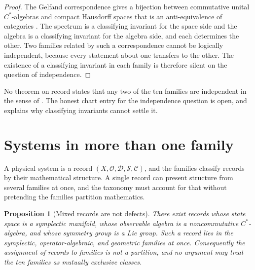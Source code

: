 \documentclass[11pt,letterpaper]{article}
\newtheorem{proposition}[theorem]{Proposition}
\theoremstyle{definition}
\theoremstyle{remark}
\begin{document}
\begin{proof}
The Gelfand correspondence gives a bijection between commutative unital $C^*$-algebras and compact Hausdorff spaces that is an anti-equivalence of categories \cite{gelfand-duality,gelfand-naimark}. The spectrum is a classifying invariant for the space side and the algebra is a classifying invariant for the algebra side, and each determines the other. Two families related by such a correspondence cannot be logically independent, because every statement about one transfers to the other. The existence of a classifying invariant in each family is therefore silent on the question of independence.
\end{proof}

No theorem on record states that any two of the ten families are independent in the sense of . The honest chart entry for the independence question is open, and  explains why classifying invariants cannot settle it.

\section{Systems in more than one family}
\label{sec:mixing}

A physical system is a record $(X, \mathcal{O}, \mathcal{D}, \mathcal{S}, \mathcal{C})$, and the families classify records by their mathematical structure. A single record can present structure from several families at once, and the taxonomy must account for that without pretending the families partition mathematics.

\begin{proposition}[Mixed records are not defects]
\label{prop:mixed}
There exist records whose state space is a symplectic manifold, whose observable algebra is a noncommutative $C^*$-algebra, and whose symmetry group is a Lie group. Such a record lies in the symplectic, operator-algebraic, and geometric families at once. Consequently the assignment of records to families is not a partition, and no argument may treat the ten families as mutually exclusive classes.
\end{proposition}
\end{document}
